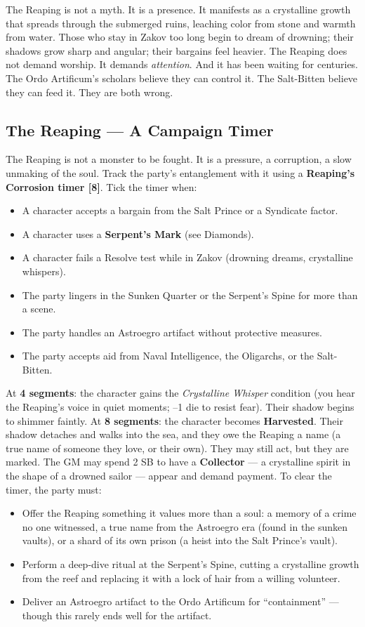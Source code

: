 The Reaping is not a myth. It is a presence. It manifests as a crystalline growth that spreads through the submerged ruins, leaching color from stone and warmth from water. Those who stay in Zakov too long begin to dream of drowning; their shadows grow sharp and angular; their bargains feel heavier. The Reaping does not demand worship. It demands \textit{attention}. And it has been waiting for centuries. The Ordo Artificum's scholars believe they can control it. The Salt-Bitten believe they can feed it. They are both wrong.

\subsection*{The Reaping --- A Campaign Timer}
\label{sec:zakov-reaping}

The Reaping is not a monster to be fought. It is a pressure, a corruption, a slow unmaking of the soul. Track the party's entanglement with it using a \textbf{Reaping's Corrosion timer [8]}. Tick the timer when:
\begin{itemize}
  \item A character accepts a bargain from the Salt Prince or a Syndicate factor.
  \item A character uses a \textbf{Serpent's Mark} (see Diamonds).
  \item A character fails a Resolve test while in Zakov (drowning dreams, crystalline whispers).
  \item The party lingers in the Sunken Quarter or the Serpent's Spine for more than a scene.
  \item The party handles an Astroegro artifact without protective measures.
  \item The party accepts aid from Naval Intelligence, the Oligarchs, or the Salt-Bitten.
\end{itemize}
\noindent At \textbf{4 segments}: the character gains the \textit{Crystalline Whisper} condition (you hear the Reaping's voice in quiet moments; --1 die to resist fear). Their shadow begins to shimmer faintly. At \textbf{8 segments}: the character becomes \textbf{Harvested}. Their shadow detaches and walks into the sea, and they owe the Reaping a name (a true name of someone they love, or their own). They may still act, but they are marked. The GM may spend 2 SB to have a \textbf{Collector} --- a crystalline spirit in the shape of a drowned sailor --- appear and demand payment. To clear the timer, the party must:
\begin{itemize}
  \item Offer the Reaping something it values more than a soul: a memory of a crime no one witnessed, a true name from the Astroegro era (found in the sunken vaults), or a shard of its own prison (a heist into the Salt Prince's vault).
  \item Perform a deep-dive ritual at the Serpent's Spine, cutting a crystalline growth from the reef and replacing it with a lock of hair from a willing volunteer.
  \item Deliver an Astroegro artifact to the Ordo Artificum for ``containment'' --- though this rarely ends well for the artifact.
\end{itemize}

